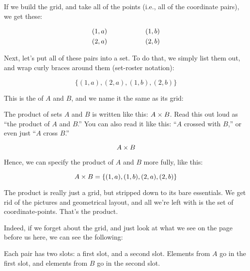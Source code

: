 \documentclass[../../../main.tex]{subfiles}
\begin{document}
If we build the grid, and take all of the points (i.e., all of the coordinate pairs), we get these:

\begin{equation*}
  \begin{split}
    (1, a)  & \hskip 2cm (1, b) \\
    (2, a) & \hskip 2cm (2, b)
  \end{split}
\end{equation*}

Next, let's put all of these pairs into a set. To do that, we simply list them out, and wrap curly braces around them (set-roster notation):

\begin{equation*}
  \{ (1, a), (2, a), (1, b), (2, b) \}
\end{equation*}

This is the  of $A$ and $B$, and we name it the same as its grid:

\begin{aside}
  \begin{notation}
    The product of sets $A$ and $B$ is written like this: $A \times B$. Read this out loud as ``the product of $A$ and $B$.'' You can also read it like this: ``$A$ crossed with $B$,'' or even just ``$A$ cross $B$.''
  \end{notation}
\end{aside}

\begin{equation*}
  A \times B
\end{equation*}

Hence, we can specify the product of $A$ and $B$ more fully, like this:

\begin{equation*}
  A \times B = \{ (1, a), (1, b), (2, a), (2, b) \}
\end{equation*}

The product is really just a grid, but stripped down to its bare essentials. We get rid of the pictures and geometrical layout, and all we're left with is the set of coordinate-points. That's the product.

Indeed, if we forget about the grid, and just look at what we see on the page before us here, we can see the following:

\begin{aside}
  \begin{remark}
    Each pair has two slots: a first slot, and a second slot. Elements from $A$ go in the first slot, and elements from $B$ go in the second slot.
  \end{remark}
\end{aside}
\end{document}
